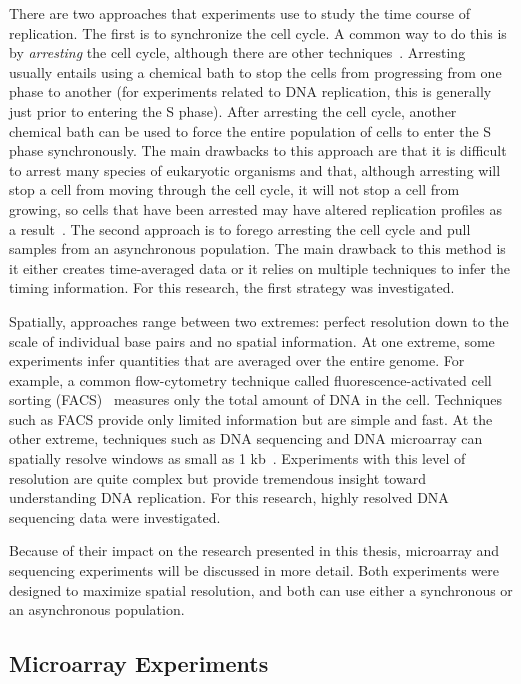 	There are two approaches that experiments use to study the time course of replication.
	The first is to synchronize the cell cycle.
	A common way to do this is by \emph{arresting} the cell cycle, although there are other techniques~\cite{CellCycleSynch}.
	Arresting usually entails using a chemical bath to stop the cells from progressing from one phase to another (for experiments related to DNA replication, this is generally just prior to entering the S phase).
	After arresting the cell cycle, another chemical bath can be used to force the entire population of cells to enter the S phase synchronously.
	The main drawbacks to this approach are that  it is difficult to arrest many species of eukaryotic organisms and that, although arresting will stop a cell from moving through the cell cycle, it will not stop a cell from growing, so cells that have been arrested may have altered replication profiles as a result~\cite{CellCycleSynch}.
	The second approach is to forego arresting the cell cycle and pull samples from an asynchronous population.
	The main drawback to this method is it either creates time-averaged data or it relies on multiple techniques to infer the timing information.
	For this research, the first strategy was investigated.
	
	Spatially, approaches range between two extremes: perfect resolution down to the scale of individual base pairs and no spatial information.
	At one extreme, some experiments infer quantities that are averaged over the entire genome. 
	For example, a common flow-cytometry technique called fluorescence-activated cell sorting (FACS)~\cite{DeepSeq, SequencingReview} measures only the total amount of DNA in the cell.
	Techniques such as FACS provide only limited information but are simple and fast.
	At the other extreme, techniques such as DNA sequencing and DNA microarray can spatially resolve windows as small as 1 kb~\cite{DeepSeq}.
	Experiments with this level of resolution are quite complex but provide tremendous insight toward understanding DNA replication.
	For this research, highly resolved DNA sequencing data were investigated.
	
	Because of their impact on the research presented in this thesis, microarray and sequencing experiments will be discussed in more detail.
	Both experiments were designed to maximize spatial resolution, and both can use either a synchronous or an asynchronous population.
	
	
		\subsection{Microarray Experiments}
		\label{subsec:Microarray}
		
